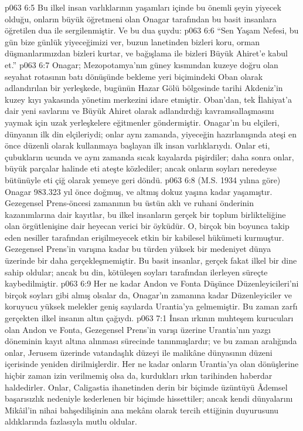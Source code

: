 \vs p063 6:5 Bu ilkel insan varlıklarının yaşamları içinde bu önemli şeyin yiyecek olduğu, onların büyük öğretmeni olan Onagar tarafından bu basit insanlara öğretilen dua ile sergilenmiştir. Ve bu dua şuydu:
\vs p063 6:6 “Sen Yaşam Nefesi, bu gün bize günlük yiyeceğimizi ver, buzun lanetinden bizleri koru, orman düşmanlarımızdan bizleri kurtar, ve bağışlama ile bizleri Büyük Ahiret’e kabul et.”
\vs p063 6:7 Onagar; Mezopotamya’nın güney kısmından kuzeye doğru olan seyahat rotasının batı dönüşünde bekleme yeri biçimindeki Oban olarak adlandırılan bir yerleşkede, bugünün Hazar Gölü bölgesinde tarihi Akdeniz’in kuzey kıyı yakasında yönetim merkezini idare etmiştir. Oban’dan, tek İlahiyat’a dair yeni savlarını ve Büyük Ahiret olarak adlandırdığı kavramsallaşmasını yaymak için uzak yerleşkelere eğitmenler göndermiştir. Onagar’ın bu elçileri, dünyanın ilk din elçileriydi; onlar aynı zamanda, yiyeceğin hazırlanışında ateşi en önce düzenli olarak kullanmaya başlayan ilk insan varlıklarıydı. Onlar eti, çubukların ucunda ve aynı zamanda sıcak kayalarda pişirdiler; daha sonra onlar, büyük parçalar halinde eti ateşte közlediler; ancak onların soyları neredeyse bütünüyle eti çiğ olarak yemeye geri döndü.
\vs p063 6:8 (M.S. 1934 yılına göre) Onagar 983.323 yıl önce doğmuş, ve altmış dokuz yaşına kadar yaşamıştır. Gezegensel Prens\hyp{}öncesi zamanının bu üstün aklı ve ruhani önderinin kazanımlarına dair kayıtlar, bu ilkel insanların gerçek bir toplum birlikteliğine olan örgütlenişine dair heyecan verici bir öyküdür. O, birçok bin boyunca takip eden nesiller tarafından erişilmeyecek etkin bir kabilesel hükümeti kurmuştur. Gezegensel Prens’in varışına kadar bu türden yüksek bir medeniyet dünya üzerinde bir daha gerçekleşmemiştir. Bu basit insanlar, gerçek fakat ilkel bir dine sahip oldular; ancak bu din, kötüleşen soyları tarafından ilerleyen süreçte kaybedilmiştir.
\vs p063 6:9 Her ne kadar Andon ve Fonta Düşünce Düzenleyicileri’ni birçok soyları gibi almış olsalar da, Onagar’ın zamanına kadar Düzenleyiciler ve koruyucu yüksek melekler geniş sayılarda Urantia’ya gelmemiştir. Bu zaman zarfı gerçekten ilkel insanın altın çağıydı.
\vs p063 7:1 İnsan ırkının muhteşem kurucuları olan Andon ve Fonta, Gezegensel Prens’in varışı üzerine Urantia’nın yazgı döneminin kayıt altına alınması sürecinde tanınmışlardır; ve bu zaman aralığında onlar, Jerusem üzerinde vatandaşlık düzeyi ile malikâne dünyasının düzeni içerisinde yeniden dirilmişlerdir. Her ne kadar onların Urantia’ya olan dönüşlerine hiçbir zaman izin verilmemiş olsa da, kurdukları ırkın tarihinden haberdar haldedirler. Onlar, Caligastia ihanetinden derin bir biçimde üzüntüyü Âdemsel başarısızlık nedeniyle kederlenen bir biçimde hissettiler; ancak kendi dünyalarını Mikâil’in nihai bahşedilişinin ana mekânı olarak tercih ettiğinin duyurusunu aldıklarında fazlasıyla mutlu oldular.
